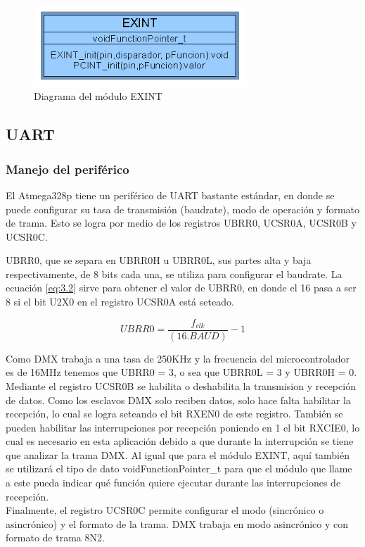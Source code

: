 \begin{figure}[!ht]
	\centering
	\includegraphics[width=8cm,scale=1]{resources/3_5-moduloEXINT.png}
	\caption{Diagrama del módulo EXINT}
	\label{fig:\thefigure}
\end{figure}


\subsection{UART}
\subsubsection{Manejo del periférico}
El Atmega328p tiene un periférico de UART bastante estándar, en donde se puede configurar su tasa de transmisión (baudrate), modo de operación y formato de trama. Esto se logra por medio de los registros UBRR0, UCSR0A, UCSR0B y UCSR0C.

UBRR0, que se separa en UBRR0H u UBRR0L, sus partes alta y baja respectivamente, de 8 bits cada una, se utiliza para configurar el baudrate. La ecuación \ref{eq:3.2} sirve para obtener el valor de UBRR0, en donde el 16 pasa a ser 8 si el bit U2X0 en el registro UCSR0A está seteado.

\begin{equation} \label{eq:\theequation}
	UBRR0 = \frac{f_{clk}}{(16.BAUD)} - 1
\end{equation}

Como DMX trabaja a una tasa de 250KHz y la frecuencia del microcontrolador es de 16MHz tenemos que UBRR0 = 3, o sea que UBRR0L = 3 y UBRR0H = 0. \\
Mediante el registro UCSR0B se habilita o deshabilita la transmision y recepción de datos. Como los esclavos DMX solo reciben datos, solo hace falta habilitar la recepción, lo cual se logra seteando el bit RXEN0 de este registro. También se pueden habilitar las interrupciones por recepción poniendo en 1 el bit RXCIE0, lo cual es necesario en esta aplicación debido a que durante la interrupción se tiene que analizar la trama DMX. Al igual que para el módulo EXINT, aquí también se utilizará el tipo de dato voidFunctionPointer\_t para que el módulo que llame a este pueda indicar qué función quiere ejecutar durante las interrupciones de recepción.\\
Finalmente, el registro UCSR0C permite configurar el modo (sincrónico o asincrónico) y el formato de la trama. DMX trabaja en modo asincrónico y con formato de trama 8N2.

